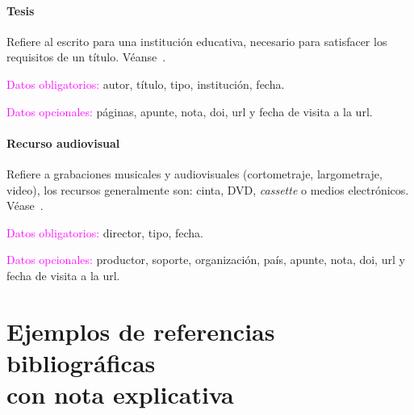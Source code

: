 \documentclass{book}
\begin{document}
{{{{{{{{{{{{{{{{{\subsubsection{Tesis}

Refiere al escrito para una institución educativa, necesario para satisfacer los requisitos de un título. Véanse~\textcite{Abdala2015,Kicillof2015}.

\begin{compactdesc}
\item [\textcolor{magenta}{Datos obligatorios:}] autor, título, tipo, institución, fecha.
\item [\textcolor{magenta}{Datos opcionales:}] páginas, apunte, nota, doi, url y fecha de visita a la url.
\end{compactdesc}

\begin{mdframed}[linewidth=.5pt,linecolor=black!30,roundcorner=3pt,backgroundcolor=yellow!15]
\noindent\vspace{-12pt}
\printbibliography[keyword=thesis,heading=none]
\end{mdframed}

\subsubsection{Recurso audiovisual}

Refiere a grabaciones musicales y audiovisuales (cortometraje, largometraje, video), los recursos generalmente son: cinta, DVD, \emph{cassette} o medios electrónicos. Véase~\textcite{KDW2008}.

\begin{compactdesc}
\item [\textcolor{magenta}{Datos obligatorios:}] director, tipo, fecha.
\item [\textcolor{magenta}{Datos opcionales:}] productor, soporte, organización, país, apunte, nota, doi, url y fecha de visita a la url.
\end{compactdesc}

\begin{mdframed}[linewidth=.5pt,linecolor=black!30,roundcorner=3pt,backgroundcolor=yellow!15]
\printbibliography[keyword=audiovisual,heading=none]
\end{mdframed}

\newgeometry{\textwidth + \marginparsep + \marginparwidth}
\chapter[Ejemplos de referencias bibliográficas con nota explicativa]{Ejemplos de referencias bibliográficas\\ con nota explicativa \label{pro-edit}}


}}}}}}}}}}}}}}}}}
\end{document}
